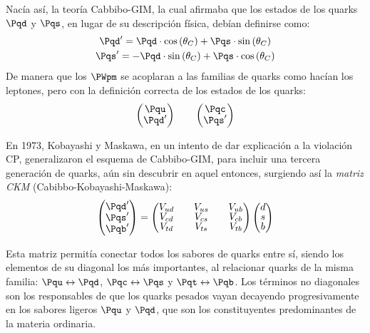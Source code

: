 Nacía así, la teoría Cabbibo-GIM, la cual afirmaba que los estados de los quarks $\Pqd$ y $\Pqs$, en lugar de su descripción física, debían definirse como:
\begin{equation}
\begin{gathered}
\Pqd'=\Pqd \cdot \cos \left( \theta _{C}\right) + \Pqs \cdot \sin \left( \theta _{C}\right) \\
\Pqs'= - \Pqd \cdot \sin \left( \theta _{C}\right) + \Pqs \cdot \cos \left( \theta_C\right)
\end{gathered}
\end{equation}
De manera que los $\PWpm$ se acoplaran a las familias de quarks como hacían los leptones, pero con la definición correcta de los estados de los quarks:
\begin{align}
\begingroup 
\renewcommand*{\arraystretch}{0.8}
\setlength\arraycolsep{10pt}
\begin{pmatrix} \Pqu \\ \Pqd' \end{pmatrix} \qquad
\begin{pmatrix} \Pqc \\ \Pqs' \end{pmatrix}
\endgroup
\end{align}

En 1973, Kobayashi y Maskawa, en un intento de dar explicación a la violación CP, generalizaron el esquema de Cabbibo-GIM, para incluir una tercera generación de quarks, aún sin descubrir en aquel entonces, surgiendo así la \textit{matriz CKM} (Cabibbo-Kobayashi-Maskawa):
\begin{equation}
\begingroup 
\renewcommand*{\arraystretch}{0.8}
\setlength\arraycolsep{10pt}
\begin{pmatrix} \Pqd' \\ \Pqs' \\ \Pqb' \end{pmatrix} =\begin{pmatrix} V_{ud} & V_{us} & V_{ub} \\ V_{cd} & V_{cs} & V_{cb} \\ V_{td} & V_{ts} & V_{tb} \end{pmatrix}\begin{pmatrix} d \\ s \\ b \end{pmatrix}
\endgroup\label{eq:CKM}
\end{equation}

Esta matriz permitía conectar todos los sabores de quarks entre sí, siendo los elementos de su diagonal los más importantes, al relacionar quarks de la misma familia: $\Pqu \leftrightarrow \Pqd$, $\Pqc \leftrightarrow \Pqs$ y $\Pqt \leftrightarrow \Pqb$. Los términos no diagonales son los responsables de que los quarks pesados vayan decayendo progresivamente en los sabores ligeros $\Pqu$ y $\Pqd$, que son los constituyentes predominantes de la materia ordinaria. 

